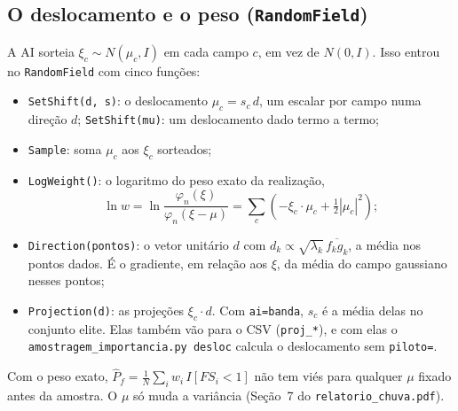 \documentclass[11pt,a4paper]{article}
\begin{document}
\subsection{O deslocamento e o peso (\texttt{RandomField})}
A AI sorteia $\xi_c \sim N(\mu_c, I)$ em cada campo $c$, em vez de $N(0, I)$. Isso entrou no \texttt{RandomField} com
cinco funções:
\begin{itemize}
\item \texttt{SetShift(d, s)}: o deslocamento $\mu_c = s_c\, d$, um escalar por campo numa direção $d$;
\texttt{SetShift(mu)}: um deslocamento dado termo a termo;
\item \texttt{Sample}: soma $\mu_c$ aos $\xi_c$ sorteados;
\item \texttt{LogWeight()}: o logaritmo do peso exato da realização,
\[
\ln w = \ln \frac{\varphi_n(\xi)}{\varphi_n(\xi - \mu)} = \sum_c \left(-\xi_c \cdot \mu_c + \tfrac12 |\mu_c|^2\right);
\]
\item \texttt{Direction(pontos)}: o vetor unitário $d$ com $d_k \propto \sqrt{\lambda_k}\,\overline{f_k g_k}$, a média
nos pontos dados. É o gradiente, em relação aos $\xi$, da média do campo gaussiano nesses pontos;
\item \texttt{Projection(d)}: as projeções $\xi_c \cdot d$. Com \texttt{ai=banda}, $s_c$ é a média delas no conjunto
elite. Elas também vão para o CSV (\texttt{proj\_*}), e com elas o \texttt{amostragem\_importancia.py desloc} calcula o
deslocamento sem \texttt{piloto=}.
\end{itemize}
Com o peso exato, $\hat P_f = \frac1N \sum_i w_i\, I[FS_i < 1]$ não tem viés para qualquer $\mu$ fixado antes da amostra.
O $\mu$ só muda a variância (Seção~7 do \texttt{relatorio\_chuva.pdf}).
\end{document}
